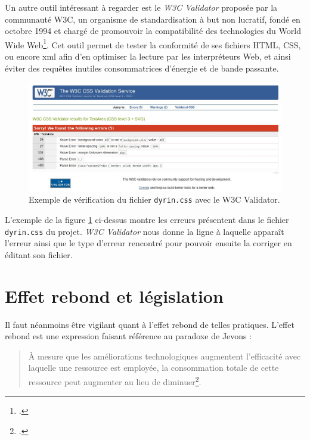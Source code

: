 \documentclass[a4paper,12pt,twoside]{book}
\begin{document}
Un autre outil intéressant à regarder est le \textit{W3C Validator} proposée par la communauté W3C, un organisme de standardisation à but non lucratif, fondé en octobre 1994 et chargé de promouvoir la compatibilité des technologies du World Wide Web\footcite{w3c}. Cet outil permet de tester la conformité de ses fichiers \acrshort{HTML}, \acrshort{CSS}, ou encore xml afin d'en optimiser la lecture par les interpréteurs Web, et ainsi éviter des requêtes inutiles consommatrices d'énergie et de bande passante.

\begin{figure}[H]
    \centering
    \includegraphics[width=1\linewidth]{img/partie_3/css_validator.JPG}
    \caption{Exemple de vérification du fichier \texttt{dyrin.css} avec le W3C Validator.}
    \label{validator}
\end{figure}

L'exemple de la figure \ref{validator} ci-dessus montre les erreurs présentent dans le fichier \texttt{dyrin.css} du projet. \textit{W3C Validator} nous donne la ligne à laquelle apparaît l'erreur ainsi que le type d'erreur rencontré pour pouvoir ensuite la corriger en éditant son fichier.
\section{Effet rebond et législation}

Il faut néanmoins être vigilant quant à l'effet rebond de telles pratiques. L'effet rebond est une expression faisant référence au paradoxe de Jevons :
\begin{quote}
    À mesure que les améliorations technologiques augmentent l'efficacité avec laquelle une ressource est employée, la consommation totale de cette ressource peut augmenter au lieu de diminuer\footcite{jacoby_fuel-efficiency_2009}.
\end{quote}
\end{document}
